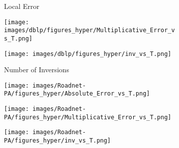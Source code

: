 \begin{figure*}[htbp]
\begin{subfigure}[b]{\textwidth}
\begin{minipage}[b]{0.3\textwidth}
	\end{minipage}%
	\begin{minipage}[b]{0.3\textwidth}
		\centering
		\caption*{Local Error} %
		\texttt{[image: images/dblp/figures\_hyper/Multiplicative\_Error\_vs\_T.png]} %
		
	\end{minipage}%
	\begin{minipage}[b]{0.3\textwidth}
		\centering
		\caption*{Number of Inversions} %
		\texttt{[image: images/dblp/figures\_hyper/inv\_vs\_T.png]} %
	\end{minipage}
\end{subfigure}
	\begin{subfigure}[b]{\textwidth}
		\centering
		\begin{minipage}[b]{0.05\textwidth}
			\centering
		\end{minipage}%
		\begin{minipage}[b]{0.3\textwidth}
			\centering
			\texttt{[image: images/Roadnet-PA/figures\_hyper/Absolute\_Error\_vs\_T.png]} %
			
		\end{minipage}%
		\begin{minipage}[b]{0.3\textwidth}
			\centering
			
			\texttt{[image: images/Roadnet-PA/figures\_hyper/Multiplicative\_Error\_vs\_T.png]} %
			
		\end{minipage}%
		\begin{minipage}[b]{0.3\textwidth}
			\centering
			
			\texttt{[image: images/Roadnet-PA/figures\_hyper/inv\_vs\_T.png]} %
		\end{minipage}
		

\end{subfigure}
\end{figure*}
